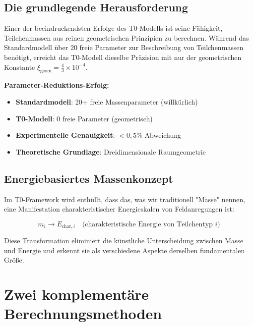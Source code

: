 \documentclass[12pt,a4paper]{report}
\newcommand{\xigeom}{\xi_{\text{geom}}}   %
\begin{document}
\subsection{Die grundlegende Herausforderung}
\label{subsec:fundamental_challenge}

Einer der beeindruckendsten Erfolge des T0-Modells ist seine Fähigkeit, Teilchenmassen aus reinen geometrischen Prinzipien zu berechnen. Während das Standardmodell über 20 freie Parameter zur Beschreibung von Teilchenmassen benötigt, erreicht das T0-Modell dieselbe Präzision mit nur der geometrischen Konstante $\xigeom = \frac{4}{3} \times 10^{-4}$.

\begin{tcolorbox}[colback=green!5!white,colframe=green!75!black,title=Massen-Revolution]
	\textbf{Parameter-Reduktions-Erfolg:}
	\begin{itemize}
		\item \textbf{Standardmodell}: 20+ freie Massenparameter (willkürlich)
		\item \textbf{T0-Modell}: 0 freie Parameter (geometrisch)
		\item \textbf{Experimentelle Genauigkeit}: $< 0,5\%$ Abweichung
		\item \textbf{Theoretische Grundlage}: Dreidimensionale Raumgeometrie
	\end{itemize}
\end{tcolorbox}

\subsection{Energiebasiertes Massenkonzept}
\label{subsec:energy_based_mass}

Im T0-Framework wird enthüllt, dass das, was wir traditionell "Masse" nennen, eine Manifestation charakteristischer Energieskalen von Feldanregungen ist:

\begin{equation}
	\boxed{m_i \rightarrow E_{\text{char},i} \quad \text{(charakteristische Energie von Teilchentyp } i\text{)}}
	\label{eq:mass_to_energy}
\end{equation}

Diese Transformation eliminiert die künstliche Unterscheidung zwischen Masse und Energie und erkennt sie als verschiedene Aspekte derselben fundamentalen Größe.

\section{Zwei komplementäre Berechnungsmethoden}
\label{sec:two_calculation_methods}
\end{document}
